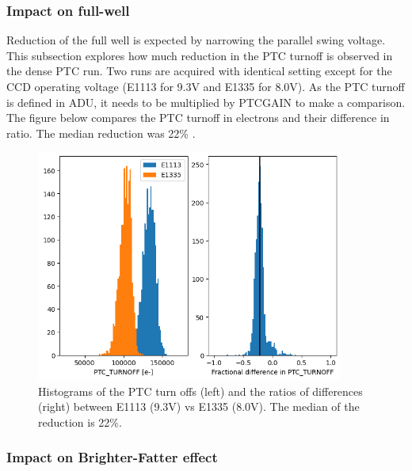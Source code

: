 


\subsubsection{Impact on full-well}\label{impact-on-full-well}

Reduction of the full well is expected by narrowing the parallel swing
voltage. This subsection explores how much reduction in the PTC turnoff
is observed in the dense PTC run. Two runs are acquired with identical
setting except for the CCD operating voltage (E1113 for 9.3V and E1335
for 8.0V). As the PTC turnoff is defined in ADU, it needs to be
multiplied by PTC\label{gain}{GAIN} to make a comparison.
The figure below compares the PTC turnoff in electrons and their
difference in ratio. The median reduction was 22\% .

\begin{figure}
\begin{centering}
\includegraphics[width=0.9\textwidth]{sections/figures/PtcTurnoffRatio.png}
\end{centering}
\caption{Histograms of the PTC turn offs (left) and the ratios of
differences (right) between E1113 (9.3V) vs E1335 (8.0V). The median of
the reduction is 22\%.}
\end{figure}



\subsubsection{Impact on Brighter-Fatter
effect}\label{impact-on-brighter-fatter-effect}


